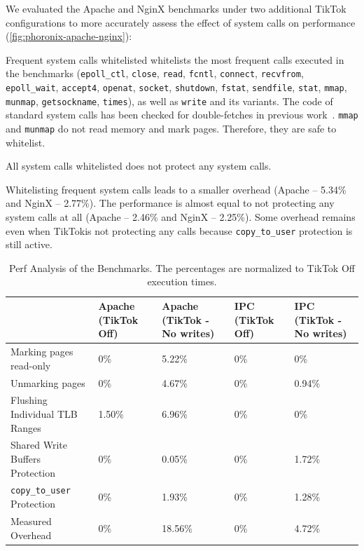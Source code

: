 \documentclass[conference]{IEEEtran}
\newcommand{\sysname}{TikTok}
\begin{document}
We evaluated the Apache and NginX benchmarks under two additional \sysname{}
configurations to more accurately assess the effect of system calls on
performance (\autoref{fig:phoronix-apache-nginx}):

\begin{LaTeXdescription}
  \item[Frequent system calls whitelisted] whitelists the most frequent calls
  executed in the benchmarks (\texttt{epoll\_ctl}, \texttt{close},
  \texttt{read}, \texttt{fcntl}, \texttt{connect}, \texttt{recvfrom},
  \texttt{epoll\_wait}, \texttt{accept4}, \texttt{openat}, \texttt{socket},
  \texttt{shutdown}, \texttt{fstat}, \texttt{sendfile}, \texttt{stat},
  \texttt{mmap}, \texttt{munmap}, \texttt{getsockname}, \texttt{times}), as well
  as \texttt{write} and its variants. The code of standard system calls has been
  checked for double-fetches in previous work~\cite{wang2017double,
  xu2018precise}. \texttt{mmap} and \texttt{munmap} do not read memory and mark
  pages. Therefore, they are safe to whitelist.


  \item[All system calls whitelisted] does not protect any system calls.
\end{LaTeXdescription}

Whitelisting frequent system calls leads to a smaller overhead (Apache -- 5.34\% and
NginX -- 2.77\%). The performance is almost equal to not protecting any
system calls at all (Apache -- 2.46\% and NginX -- 2.25\%). Some overhead
remains even when \sysname is not protecting any calls because
\texttt{copy\_to\_user} protection is still active.

\begin{table}[]
  \label{perftable}
  \centering
  \begin{tabular}{|l|l|l|l|l|}
  \hline
                                     & Apache (\sysname{} Off) & Apache (\sysname{} - No writes) & IPC (\sysname{} Off) & IPC (\sysname{} - No writes)\\ \hline
  Marking pages read-only            & 0\%    & 5.22\%          & 0\% & 0\%         \\ \hline
  Unmarking pages                    & 0\%    & 4.67\%          & 0\% & 0.94\%      \\ \hline
  Flushing Individual TLB Ranges     & 1.50\% & 6.96\%          & 0\% & 0\%         \\ \hline
  Shared Write Buffers Protection    & 0\%    & 0.05\%          & 0\% & 1.72\%      \\ \hline
  \texttt{copy\_to\_user} Protection & 0\%    & 1.93\%          & 0\% & 1.28\%      \\ \hline
  Measured Overhead                  & 0\%    & 18.56\%         & 0\% & 4.72\%      \\ \hline
  \end{tabular}
  \caption{Perf Analysis of the Benchmarks. The percentages are normalized to \sysname{} Off execution times.}
\end{table}
\end{document}
